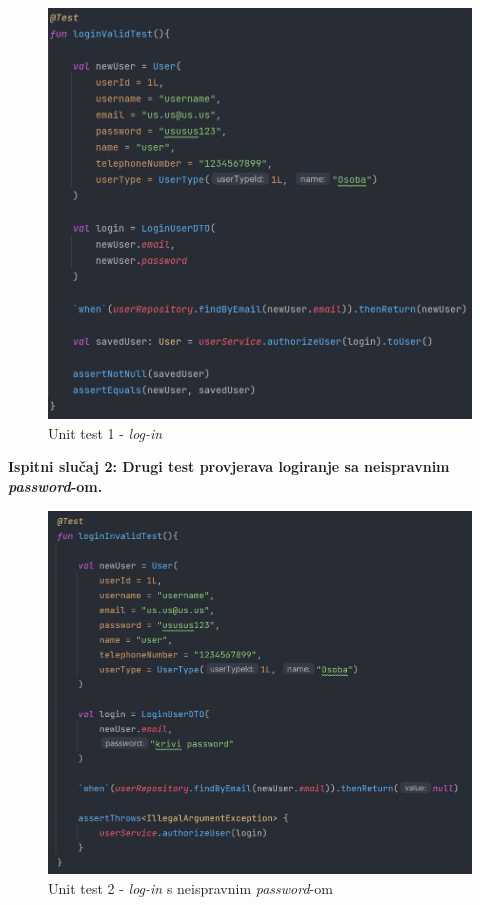 \begin{figure}[H]
			\includegraphics[scale=0.5]{slike/unit1.PNG} 
			\centering
			\caption{Unit test 1 - \textit{log-in}}
			\label{unit1}
		\end{figure}

\pagebreak
\textbf{Ispitni slučaj 2: Drugi test provjerava logiranje sa neispravnim \textit{password}-om.}

\begin{figure}[H]
			\includegraphics[scale=0.5]{slike/unit2.PNG} 
			\centering
			\caption{Unit test 2 - \textit{log-in} s neispravnim \textit{password}-om}
			\label{unit2}
		\end{figure}

